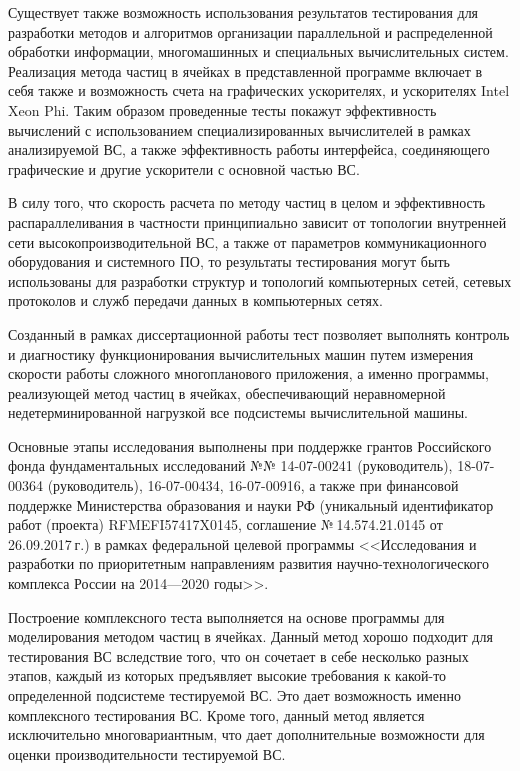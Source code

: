 Существует также возможность использования результатов тестирования для разработки методов и алгоритмов организации параллельной и распределенной обработки информации, многомашинных и специальных вычислительных систем. Реализация
метода частиц в ячейках в представленной программе включает в себя также и возможность счета на графических ускорителях, и ускорителях Intel Xeon Phi. Таким образом проведенные тесты покажут эффективность вычислений с использованием специализированных вычислителей в рамках анализируемой ВС, а также эффективность работы интерфейса, соединяющего графические и другие ускорители с основной частью ВС.

В силу того, что скорость расчета по методу частиц в целом и эффективность распараллеливания в частности принципиально зависит от топологии внутренней сети высокопроизводительной ВС, а также от параметров коммуникационного оборудования и системного ПО, то результаты тестирования могут быть использованы для разработки структур и топологий компьютерных сетей, сетевых протоколов и служб передачи данных в компьютерных сетях.

Созданный в рамках диссертационной работы тест позволяет выполнять контроль и диагностику функционирования вычислительных машин путем измерения скорости работы сложного многопланового приложения, а именно программы, реализующей метод частиц в ячейках, обеспечивающий неравномерной недетерминированной нагрузкой все подсистемы вычислительной машины.

Основные этапы исследования выполнены при поддержке грантов
Российского фонда фундаментальных исследований №№ 14-07-00241 (руководитель), 18-07-00364 (руководитель), 16-07-00434, 16-07-00916, а также при финансовой поддержке Министерства образования и науки РФ (уникальный идентификатор работ (проекта) RFMEFI57417X0145, соглашение № 14.574.21.0145 от 26.09.2017 г.) в рамках федеральной
целевой программы <<Исследования и разработки по приоритетным
направлениям развития научно-технологического комплекса России на
2014—2020 годы>>.

{\methods} Построение комплексного теста выполняется на основе программы для моделирования методом частиц в ячейках. Данный метод хорошо подходит для тестирования ВС вследствие того, что он сочетает в себе несколько разных этапов, каждый из которых предъявляет высокие требования к какой-то определенной подсистеме тестируемой ВС. Это дает возможность именно комплексного тестирования ВС. Кроме того, данный метод является исключительно многовариантным, что дает дополнительные возможности  для оценки производительности тестируемой ВС.

